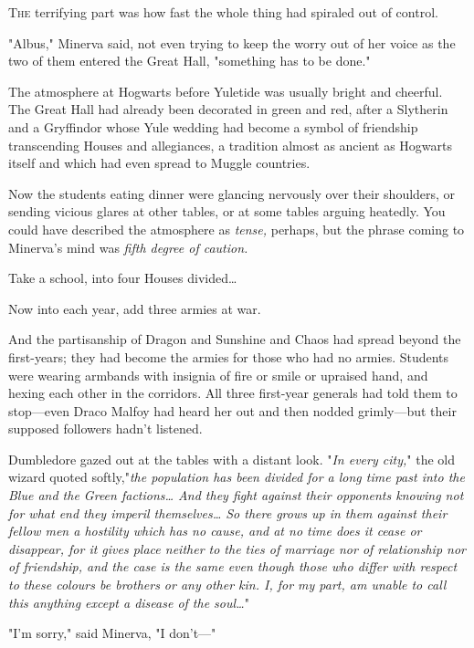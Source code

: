 
\lettrine{T}{he} terrifying part was how fast the whole thing had spiraled out of control.

"Albus," Minerva said, not even trying to keep the worry out of her voice as 
the two of them entered the Great Hall, "something has to be done."

The atmosphere at Hogwarts before Yuletide was usually bright and cheerful. The 
Great Hall had already been decorated in green and red, after a Slytherin and a 
Gryffindor whose Yule wedding had become a symbol of friendship transcending 
Houses and allegiances, a tradition almost as ancient as Hogwarts itself and 
which had even spread to Muggle countries.

Now the students eating dinner were glancing nervously over their shoulders, or 
sending vicious glares at other tables, or at some tables arguing heatedly. You 
could have described the atmosphere as \emph{tense,} perhaps, but the phrase 
coming to Minerva's mind was \emph{fifth degree of caution.}

Take a school, into four Houses divided{\ldots}

Now into each year, add three armies at war.

And the partisanship of Dragon and Sunshine and Chaos had spread beyond the 
first-years; they had become the armies for those who had no armies. Students 
were wearing armbands with insignia of fire or smile or upraised hand, and 
hexing each other in the corridors. All three first-year generals had told them 
to stop---even Draco Malfoy had heard her out and then nodded grimly---but 
their supposed followers hadn't listened.

Dumbledore gazed out at the tables with a distant look. "\emph{In every city,}" 
the old wizard quoted softly,"\emph{the population has been divided for a long 
time past into the Blue and the Green factions{\ldots} And they fight against 
their opponents knowing not for what end they imperil themselves{\ldots} So 
there grows up in them against their fellow men a hostility which has no cause, 
and at no time does it cease or disappear, for it gives place neither to the 
ties of marriage nor of relationship nor of friendship, and the case is the 
same even though those who differ with respect to these colours be brothers or 
any other kin. I, for my part, am unable to call this anything except a disease 
of the soul{\ldots}}"

"I'm sorry," said Minerva, "I don't---"

